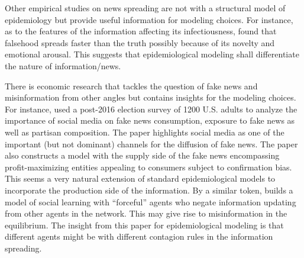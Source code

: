	Other empirical studies on news spreading are not with a structural model of epidemiology but provide useful information for modeling choices. For instance, as to the features of the information affecting its infectiousness,  \href{https://science.sciencemag.org/content/359/6380/1146}{\cite{vosoughi_spread_2018}} found that falsehood spreads faster than the truth possibly because of its novelty and emotional arousal. This suggests that epidemiological modeling shall differentiate the nature of information/news.  %

	There is economic research that tackles the question of fake news and misinformation from other angles but contains insights for the modeling choices. For instance, 	\href{https://github.com/iworld1991/EpiExp/blob/master/Literature/allcott2017social.pdf}{\cite{allcott2017social}} used a post-2016 election survey of 1200 U.S. adults to analyze the importance of social media on fake news consumption, exposure to fake news as well as partisan composition. The paper highlights social media as one of the important (but not dominant) channels for the diffusion of fake news.  The paper also constructs a model with the supply side of the fake news encompassing profit-maximizing entities appealing to consumers subject to confirmation bias. This seems a very natural extension of standard epidemiological models to incorporate the production side of the information.  By a similar token, \href{https://www.kdd.org/exploration_files/8._CR.10.Misinformation_in_social_media_-_Final.pdf}{\cite{acemoglu2010spread}} builds a model of social learning with ``forceful'' agents who negate information updating from other agents in the network. This may give rise to misinformation in the equilibrium. The insight from this paper for epidemiological modeling is that different agents might be with different contagion rules in the information spreading.

